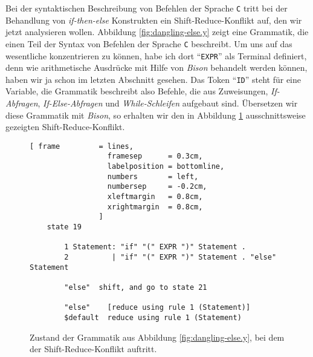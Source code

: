 \noindent
Bei der syntaktischen Beschreibung von Befehlen der Sprache \texttt{C} 
tritt bei der Behandlung
von \emph{if-then-else} Konstrukten ein Shift-Reduce-Konflikt auf, den wir jetzt analysieren wollen.
Abbildung \ref{fig:dangling-else.y} zeigt eine Grammatik, die einen Teil der Syntax von Befehlen der
Sprache \texttt{C} beschreibt.  Um uns auf das wesentliche konzentrieren zu k\"onnen, habe ich dort
``\texttt{EXPR}'' als Terminal definiert, denn wie arithmetische Ausdr\"ucke mit Hilfe von \textsl{Bison}
behandelt werden k\"onnen, haben wir ja schon im letzten Abschnitt gesehen.  Das Token ``\texttt{ID}'' steht
f\"ur eine Variable, die Grammatik beschreibt also Befehle, die aus Zuweisungen, \emph{If-Abfragen},
\emph{If-Else-Abfragen} und \emph{While-Schleifen} aufgebaut sind.  \"Ubersetzen wir diese Grammatik mit
\textsl{Bison}, so erhalten wir den in Abbildung \ref{fig:dangling-else.output} ausschnittsweise gezeigten
Shift-Reduce-Konflikt. 

\begin{figure}[!ht]
\centering
\begin{Verbatim}[ frame         = lines, 
                  framesep      = 0.3cm, 
                  labelposition = bottomline,
                  numbers       = left,
                  numbersep     = -0.2cm,
                  xleftmargin   = 0.8cm,
                  xrightmargin  = 0.8cm,
                ]
    state 19
    
        1 Statement: "if" "(" EXPR ")" Statement .
        2          | "if" "(" EXPR ")" Statement . "else" Statement
    
        "else"  shift, and go to state 21
    
        "else"    [reduce using rule 1 (Statement)]
        $default  reduce using rule 1 (Statement)
\end{Verbatim}
\vspace*{-0.3cm}
\caption{Zustand der Grammatik aus Abbildung \ref{fig:dangling-else.y}, bei dem der Shift-Reduce-Konflikt auftritt.}
\label{fig:dangling-else.output}
\end{figure}


